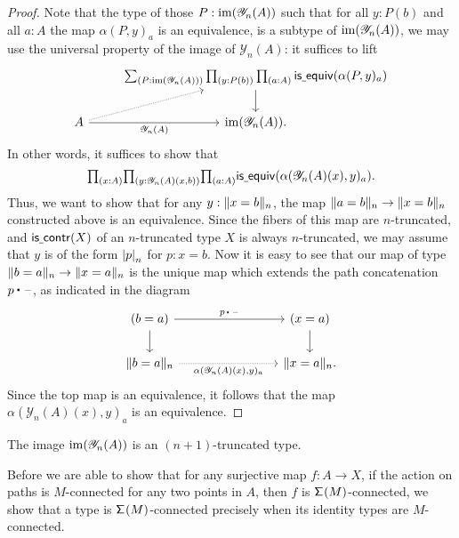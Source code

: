 \begin{proof}
Note that the type of those $P:\im(\mathscr{Y}_n(A))$ such that for all $y:P(b)$ and all $a:A$ the map $\alpha(P,y)_a$ is an equivalence, is a subtype of $\im(\mathscr{Y}_n(A))$, we may use the universal property of the image of $\mathscr{Y}_n(A)$: it suffices to lift
\begin{equation*}
\begin{tikzcd}
& \sm{P:\im(\mathscr{Y}_n(A))}\prd{y:P(b)}{a:A}\isequiv(\alpha(P,y)_a) \arrow[d] \\
A \arrow[ur,densely dotted] \arrow[r,swap,"\mathscr{Y}_n(A)"] & \im(\mathscr{Y}_n(A)).
\end{tikzcd}
\end{equation*}
In other words, it suffices to show that 
\begin{equation*}
\prd{x:A}{y:\mathscr{Y}_n(A)(x,b)}{a:A}\isequiv(\alpha(\mathscr{Y}_n(A)(x),y)_a).
\end{equation*}
Thus, we want to show that for any $y:\trunc{n}{x=b}$, the map $\trunc{n}{a=b}\to\trunc{n}{x=b}$ constructed above is an equivalence.
Since the fibers of this map are $n$-truncated, and $\iscontr(X)$ of an $n$-truncated type $X$ is always $n$-truncated, we may assume that $y$ is of the form $\tproj{n}{p}$ for $p:x=b$. 
Now it is easy to see that our map of type $\trunc{n}{b=a}\to\trunc{n}{x=a}$ is the unique map which
extends the path concatenation $\ct{p}{\blank}$, as indicated in the diagram
\begin{equation*}
\begin{tikzcd}[column sep=8em]
(b=a) \arrow[r,"\ct{p}{\blank}"] \arrow[d] & (x=a) \arrow[d] \\
\trunc{n}{b=a} \arrow[r,densely dotted,swap,"{\alpha(\mathscr{Y}_n(A)(x),y)_a}"] & \trunc{n}{x=a}.
\end{tikzcd}
\end{equation*}
Since the top map is an equivalence, it follows that the map $\alpha(\mathscr{Y}_n(A)(x),y)_a$ is an equivalence.
\end{proof}

\begin{cor}\label{cor:truncated}
The image $\im(\mathscr{Y}_n(A))$ is an $(n+1)$-truncated type. 
\end{cor}

Before we are able to show that for any surjective map $f:A\to X$, if the action on paths is $M$-connected for any two points in $A$, then $f$ is $\susp(M)$-connected, we show that a type is $\susp(M)$-connected precisely when its identity types are $M$-connected.

